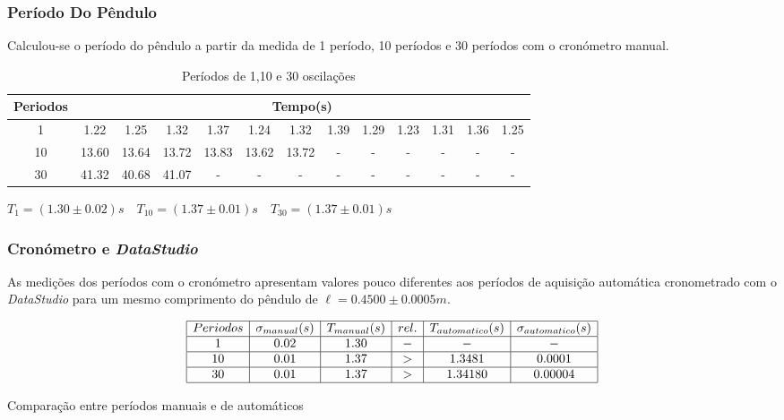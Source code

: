 \documentclass{beamer}
\begin{document}
\begin{frame}
	\frametitle{Período Do Pêndulo}
	Calculou-se o período do pêndulo a partir da medida de 1 período, 10 períodos e 30 períodos com o 		cronómetro manual.

	\begin{table}[]
	\centering
	\begin{adjustbox}{width=\textwidth}
			\begin{tabular}{|c|c|c|c|c|c|c|c|c|c|c|c|c|} \hline
			Periodos & \multicolumn{12}{c}{Tempo(s)} \\ \hline
			1 & 1.22 & 1.25 & 1.32 & 1.37 & 1.24 & 1.32 & 1.39 & 1.29 & 1.23 & 1.31 & 1.36 & 1.25 \\ 				\hline
			10 & 13.60 & 13.64 & 13.72 & 13.83 & 13.62 & 13.72 & - & - & - & - & - & - \\ \hline
			30 & 41.32 & 40.68 & 41.07 & - & - & - & - & - & - & - & - & - \\ \hline
		\end{tabular}
		\end{adjustbox}
				\caption{Períodos de 1,10 e 30 oscilações}
	\end{table}
	$ T_1=(1.30 \pm 0.02)s \quad T_{10}=(1.37 \pm0.01)s \quad T_{30}=(1.37 \pm 0.01)s$
	
\end{frame}

\begin{frame}
	\frametitle{Cronómetro e \textit{DataStudio}}
	As medições dos períodos com o cronómetro apresentam valores pouco diferentes aos períodos de aquisição automática cronometrado com o \textit{DataStudio} para um mesmo comprimento do pêndulo de $\ell=0.4500 \pm 0.0005 m$.
	\begin{table} [h]
		$$\begin{array}{|c|c|c|c|c|c|} \hline
			Periodos & \sigma_{manual}(s) & T_{manual}(s) & rel. & T_{automatico}(s) & \sigma_{automatico}(s)	\\ 	\hline
			1 & 0.02 & 1.30 & - & -&- \\ 				\hline
			10 & 0.01& 1.37 & > & 1.3481&0.0001 \\ 				\hline
			30 &0.01& 1.37 & > & 1.34180 &0.00004\\ 				\hline
		\end{array}$$
		\caption{Comparação entre períodos manuais e de automáticos}
	\end{table}
\end{frame}
\end{document}

